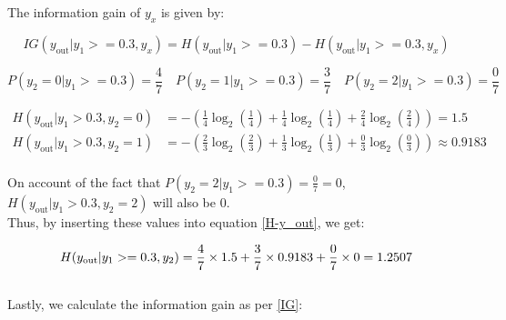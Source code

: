 \documentclass[12pt]{article}
\begin{document}
\begin{enumerate}[leftmargin=\labelsep]
The information gain of $y_x$ is given by:

\begin{equation}\label{IG}
    IG(y_{\text{out}} | y_1 >= 0.3, y_x) = H(y_{\text{out}} | y_1 >= 0.3) - H(y_{\text{out}} | y_1 >= 0.3, y_x)
\end{equation}

\vspace{0.2cm}

\begin{equation*}
    P(y_2 = 0 | y_1 >= 0.3) = \frac{4}{7} \quad
    P(y_2 = 1 | y_1 >= 0.3) = \frac{3}{7} \quad
    P(y_2 = 2 | y_1 >= 0.3) = \frac{0}{7} \quad
\end{equation*}

\begin{equation*}
    \begin{aligned}
        H(y_{\text{out}} | y_1 > 0.3, y_2 = 0) &= - \left( \frac{1}{4} \log_2 \left( \frac{1}{4} \right) + \frac{1}{4} \log_2 \left( \frac{1}{4} \right) + \frac{2}{4} \log_2 \left( \frac{2}{4} \right) \right) = 1.5
        \\
        H(y_{\text{out}} | y_1 > 0.3, y_2 = 1) &= - \left( \frac{2}{3} \log_2 \left( \frac{2}{3} \right) + \frac{1}{3} \log_2 \left( \frac{1}{3} \right) + \frac{0}{3} \log_2 \left( \frac{0}{3} \right) \right) \approx 0.9183
        \\
    \end{aligned}
\end{equation*}

\newpage
On account of the fact that $P(y_2 = 2 | y_1 >= 0.3) = \frac{0}{7} = 0$, $H(y_{\text{out}} | y_1 > 0.3, y_2 = 2)$ will also be 0.\\

Thus, by inserting these values into equation \eqref{H-y_out}, we get:

\begin{equation*}
    H(y_{\text{out}} | y_1 >= 0.3, y_2) = \frac{4}{7} \times 1.5 + \frac{3}{7} \times 0.9183 + \frac{0}{7} \times 0 = 1.2507
    \\
\end{equation*}
\\
Lastly, we calculate the information gain as per \eqref{IG}:


\end{enumerate}
\end{document}
